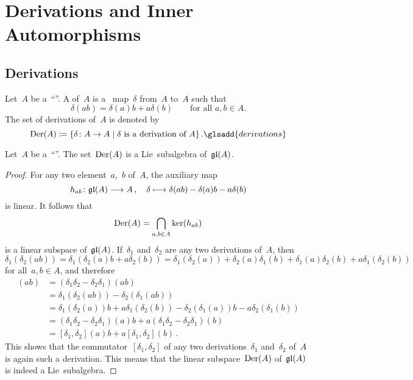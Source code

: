 \section{Derivations and Inner Automorphisms}


\subsection{Derivations}


\begin{definition}
	\label{definition of derivations}
	Let~$A$ be a~\enquote{\algebra{$\kf$}}.
	A  of~$A$ is a~{\linear{$\kf$}} map~$\delta$ from~$A$ to~$A$ such that
	\[
		\delta(ab)
		=
		\delta(a) b + a \delta(b)
		\qquad
		\text{for all~$a, b \in A$.}
	\]
	The set of derivations of~$A$ is denoted by
	\[
		\Der(A)
		\defined
		\{
			\delta
			\colon
			A
			\textstyle\to
			A
		\suchthat
			\text{$\delta$ is a derivation of~$A$}
		\}  \,.
		\glsadd{derivations}
	\]
\end{definition}


\begin{proposition}
	Let~$A$ be a~\enquote{\algebra{$\kf$}}.
	The set~$\operatorname{Der}(A)$ is a Lie~subalgebra of~$\mathfrak{gl}(A)$.
\end{proposition}


\begin{proof}
	For any two element~$a$,~$b$ of~$A$, the auxiliary map
	\[
		h_{ab}
		\colon
		\gllie(A)
		\to
		A \,,
		\quad
		\delta
		\mapsto
		\delta(ab) - \delta(a)b - a \delta(b)
	\]
	is linear.
	It follows that
	\[
		\operatorname{Der}(A)
		=
		\bigcap_{a, b \in A}
		\ker( h_{ab} )
	\]
	is a linear subspace of~$\mathfrak{gl}(A)$.
	If~$\delta_1$ and~$\delta_2$ are any two derivations of~$A$, then
	\[
		\delta_1( \delta_2(ab) )
		=
		\delta_1( \delta_2(a) b + a \delta_2(b) )
		=
		\delta_1(\delta_2(a)) + \delta_2(a) \delta_1(b)
		+ \delta_1(a) \delta_2(b) + a \delta_1( \delta_2(b) )
	\]
	for all~$a, b \in A$, and therefore
	\begin{align*}
		[\delta_1, \delta_2](ab)
		&=
		(\delta_1 \delta_2 - \delta_2 \delta_1)(ab)
		\\
		&=
		\delta_1( \delta_2(ab) ) - \delta_2( \delta_1(ab) )
		\\
		&=
		\delta_1(\delta_2(a)) b + a \delta_1(\delta_2(b))
		- \delta_2(\delta_1(a)) b - a \delta_2(\delta_1(b))
		\\
		&=
		(\delta_1 \delta_2 - \delta_2 \delta_1)(a) b
		+ a (\delta_1 \delta_2 - \delta_2 \delta_1)(b)
		\\
		&=
		[\delta_1, \delta_2](a) b + a [\delta_1, \delta_2](b) \,.
	\end{align*}
	This shows that the commutator~$[\delta_1, \delta_2]$ of any two derivations~$\delta_1$ and~$\delta_2$ of~$A$ is again such a derivation.
	This means that the linear subspace~$\operatorname{Der}(A)$ of~$\mathfrak{gl}(A)$ is indeed a Lie~subalgebra.
\end{proof}


